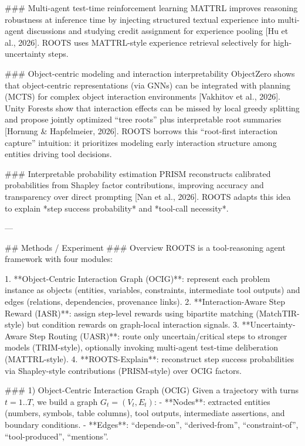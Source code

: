 ### Multi-agent test-time reinforcement learning
MATTRL improves reasoning robustness at inference time by injecting structured textual experience into multi-agent discussions and studying credit assignment for experience pooling [Hu et al., 2026]. ROOTS uses MATTRL-style experience retrieval selectively for high-uncertainty steps.

### Object-centric modeling and interaction interpretability
ObjectZero shows that object-centric representations (via GNNs) can be integrated with planning (MCTS) for complex object interaction environments [Vakhitov et al., 2026]. Unity Forests show that interaction effects can be missed by local greedy splitting and propose jointly optimized “tree roots” plus interpretable root summaries [Hornung & Hapfelmeier, 2026]. ROOTS borrows this “root-first interaction capture” intuition: it prioritizes modeling early interaction structure among entities driving tool decisions.

### Interpretable probability estimation
PRISM reconstructs calibrated probabilities from Shapley factor contributions, improving accuracy and transparency over direct prompting [Nan et al., 2026]. ROOTS adapts this idea to explain *step success probability* and *tool-call necessity*.

---

## Methods / Experiment
### Overview
ROOTS is a tool-reasoning agent framework with four modules:

1. **Object-Centric Interaction Graph (OCIG)**: represent each problem instance as objects (entities, variables, constraints, intermediate tool outputs) and edges (relations, dependencies, provenance links).
2. **Interaction-Aware Step Reward (IASR)**: assign step-level rewards using bipartite matching (MatchTIR-style) but condition rewards on graph-local interaction signals.
3. **Uncertainty-Aware Step Routing (UASR)**: route only uncertain/critical steps to stronger models (TRIM-style), optionally invoking multi-agent test-time deliberation (MATTRL-style).
4. **ROOTS-Explain**: reconstruct step success probabilities via Shapley-style contributions (PRISM-style) over OCIG factors.

### 1) Object-Centric Interaction Graph (OCIG)
Given a trajectory with turns \(t=1..T\), we build a graph \(G_t=(V_t,E_t)\):
- **Nodes**: extracted entities (numbers, symbols, table columns), tool outputs, intermediate assertions, and boundary conditions.
- **Edges**: “depends-on”, “derived-from”, “constraint-of”, “tool-produced”, “mentions”.

